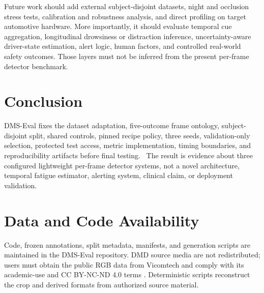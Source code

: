 \documentclass[conference]{IEEEtran}
\begin{document}
Future work should add external subject-disjoint datasets, night and occlusion stress tests, calibration and robustness analysis, and direct profiling on target automotive hardware. More importantly, it should evaluate temporal cue aggregation, longitudinal drowsiness or distraction inference, uncertainty-aware driver-state estimation, alert logic, human factors, and controlled real-world safety outcomes. Those layers must not be inferred from the present per-frame detector benchmark.

\section{Conclusion}
DMS-Eval fixes the dataset adaptation, five-outcome frame ontology, subject-disjoint split, shared controls, pinned recipe policy, three seeds, validation-only selection, protected test access, metric implementation, timing boundaries, and reproducibility artifacts before final testing. \ConclusionResultSentence\ The result is evidence about three configured lightweight per-frame detector systems, not a novel architecture, temporal fatigue estimator, alerting system, clinical claim, or deployment validation.

\section*{Data and Code Availability}
Code, frozen annotations, split metadata, manifests, and generation scripts are maintained in the DMS-Eval repository. DMD source media are not redistributed; users must obtain the public RGB data from Vicomtech and comply with its academic-use and CC BY-NC-ND 4.0 terms \cite{dmdwebsite}. Deterministic scripts reconstruct the crop and derived formats from authorized source material.



\end{document}
